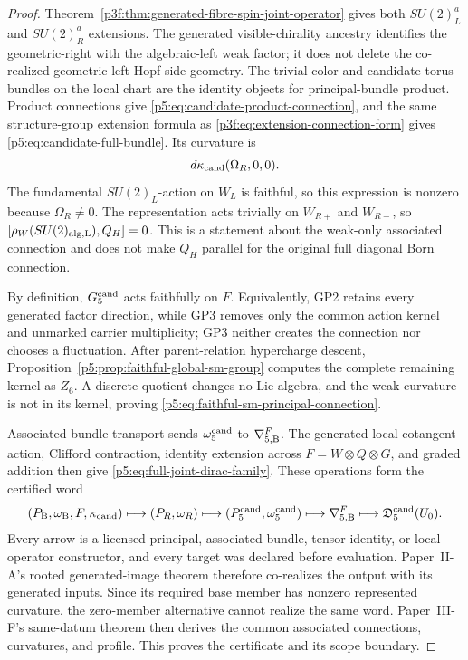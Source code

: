 \documentclass[11pt,a4paper]{article}
\begin{document}
\begin{proof}
Theorem~\ref{p3f:thm:generated-fibre-spin-joint-operator} gives both
\(SU(2)^a_L\) and \(SU(2)^a_R\) extensions.  The generated visible-chirality
ancestry identifies the geometric-right with the algebraic-left weak factor; it does not delete the
co-realized geometric-left Hopf-side geometry.  The trivial color and candidate-torus
bundles on the local chart are the identity objects for principal-bundle
product.  Product connections give \eqref{p5:eq:candidate-product-connection},
and the same structure-group extension formula as
\eqref{p3f:eq:extension-connection-form} gives
\eqref{p5:eq:candidate-full-bundle}.  Its curvature is
\[
d\kappa_{\rm cand}(\Omega_R,0,0).
\]
The fundamental \(SU(2)_L\)-action on \(W_L\) is faithful, so this expression
is nonzero because \(\Omega_R\ne0\).
The representation acts trivially on \(W_{R+}\) and \(W_{R-}\), so
\([\rho_W(SU(2)_{\rm alg,L}),Q_H]=0\). This is a statement about
the weak-only associated connection and does not make \(Q_H\) parallel
for the original full diagonal Born connection.

By definition, \(G_5^{\rm cand}\) acts faithfully on \(F\).  Equivalently,
GP2 retains every generated factor direction, while GP3 removes only the
common action kernel and unmarked carrier multiplicity; GP3 neither creates
the connection nor chooses a fluctuation.  After parent-relation hypercharge descent,
Proposition~\ref{p5:prop:faithful-global-sm-group} computes the complete
remaining kernel as \(Z_6\).  A discrete quotient changes no Lie algebra, and
the weak curvature is not in its kernel, proving
\eqref{p5:eq:faithful-sm-principal-connection}.

Associated-bundle transport sends \(\omega_5^{\rm cand}\) to
\(\nabla_{5,{\rm B}}^F\).  The generated local cotangent action, Clifford
contraction, identity extension across \(F=W\otimes Q\otimes G\), and graded
addition then give \eqref{p5:eq:full-joint-dirac-family}.  These operations
form the certified word
\[
(P_{\rm B},\omega_{\rm B},F,\kappa_{\rm cand})
\longmapsto(P_R,\omega_R)
\longmapsto(P_5^{\rm cand},\omega_5^{\rm cand})
\longmapsto\nabla_{5,{\rm B}}^F
\longmapsto\mathfrak D_5^{\rm cand}(U_0).
\]
Every arrow is a licensed principal, associated-bundle, tensor-identity, or
local operator constructor, and every target was declared before evaluation.
Paper~II-A's rooted generated-image theorem therefore co-realizes the output
with its generated inputs.  Since its required base member has nonzero
represented curvature, the zero-member alternative cannot realize the same
word.  Paper~III-F's same-datum theorem then derives the common associated
connections, curvatures, and profile.  This proves the certificate and its
scope boundary.
\end{proof}
\end{document}

